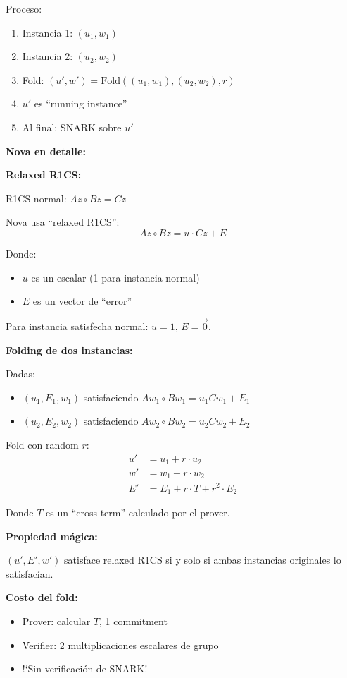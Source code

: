 \documentclass[11pt,a4paper,twoside]{book}
\begin{document}
Proceso:
\begin{enumerate}
    \item Instancia 1: $(u_1, w_1)$
    \item Instancia 2: $(u_2, w_2)$
    \item Fold: $(u', w') = \text{Fold}((u_1, w_1), (u_2, w_2), r)$
    \item $u'$ es ``running instance''
    \item Al final: SNARK sobre $u'$
\end{enumerate}

\begin{mathnote}
\textbf{Nova en detalle:}

\textbf{Relaxed R1CS:}

R1CS normal: $Az \circ Bz = Cz$

Nova usa ``relaxed R1CS'':
\[ Az \circ Bz = u \cdot Cz + E \]

Donde:
\begin{itemize}
    \item $u$ es un escalar (1 para instancia normal)
    \item $E$ es un vector de ``error''
\end{itemize}

Para instancia satisfecha normal: $u = 1$, $E = \vec{0}$.

\textbf{Folding de dos instancias:}

Dadas:
\begin{itemize}
    \item $(u_1, E_1, w_1)$ satisfaciendo $A w_1 \circ B w_1 = u_1 C w_1 + E_1$
    \item $(u_2, E_2, w_2)$ satisfaciendo $A w_2 \circ B w_2 = u_2 C w_2 + E_2$
\end{itemize}

Fold con random $r$:
\begin{align*}
u' &= u_1 + r \cdot u_2 \\
w' &= w_1 + r \cdot w_2 \\
E' &= E_1 + r \cdot T + r^2 \cdot E_2
\end{align*}

Donde $T$ es un ``cross term'' calculado por el prover.

\textbf{Propiedad m\'agica:}

$(u', E', w')$ satisface relaxed R1CS si y solo si ambas instancias originales lo satisfac\'ian.

\textbf{Costo del fold:}
\begin{itemize}
    \item Prover: calcular $T$, 1 commitment
    \item Verifier: 2 multiplicaciones escalares de grupo
    \item !`Sin verificaci\'on de SNARK!
\end{itemize}
\end{mathnote}
\end{document}
